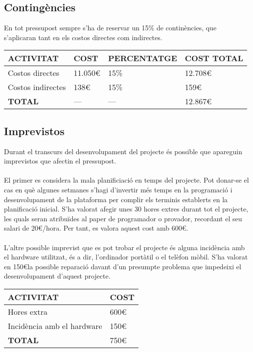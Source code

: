 \subsection{Contingències}

En tot pressupost sempre s’ha de reservar un 15\% de continències, que s’aplicaran tant en els costos directes com indirectes.
\\
\begin{center}
    \begin{tabular}{ | l | l | l | l |}
    \hline
	\textbf{ACTIVITAT}&\textbf{COST}&\textbf{PERCENTATGE}&\textbf{COST TOTAL} 		\\ \hline
    Costos directes					 	& 11.050\euro	& 15\%		& 12.708\euro		\\ \hline
    Costos indirectes				 	& 138\euro		& 15\%		& 159\euro			\\ \hline
    \textbf{TOTAL}					 	& --- 			& ---		& 12.867\euro		\\ 
    \hline
    \end{tabular}
\end{center}

\subsection{Imprevistos}

Durant el transcurs del desenvolupament del projecte és possible que apareguin imprevistos que afectin el pressupost.
\\\\
El primer es considera la mala planificiació en temps del projecte. Pot donar-se el cas en què algunes setmanes s’hagi d’invertir més temps en la programació i desenvolupament de la plataforma per complir els terminis establerts en la planificació inicial. S’ha valorat afegir unes 30 hores extres durant tot el projecte, les quals seran atribuïdes al paper de programador o provador, recordant el seu salari de 20\euro/hora. Per tant, es valora aquest cost amb 600\euro.
\\\\
L’altre possible imprevist que es pot trobar el projecte és alguna incidència amb el hardware utilitzat, és a dir, l’ordinador portàtil o el telèfon mòbil. S’ha valorat en 150\euro\space la possible reparació davant d’un presumpte problema que impedeixi el desenvolupament d’aquest projecte.
\\
\begin{center}
    \begin{tabular}{ | l | l |}
    \hline
	\textbf{ACTIVITAT}								&\textbf{COST} 		\\ \hline
    Hores extra										& 600\euro			\\ \hline
    Incidència amb el hardware						& 150\euro			\\ \hline
    \textbf{TOTAL}					 				& 750\euro			\\ 
    \hline
    \end{tabular}
\end{center}

